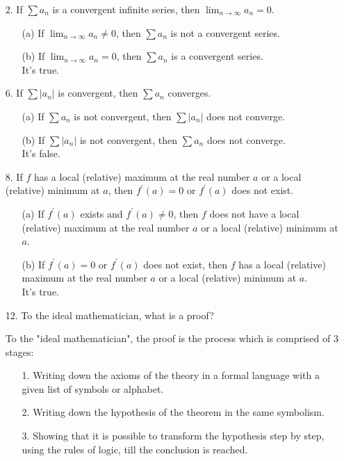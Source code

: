 \documentclass[12pt, a4paper]{article}                  %
\begin{document}
\begin{enumerate}
\item[2.]
If $\sum a_n$ is a convergent infinite series, then $\lim_{n \to \infty} a_n = 0$.
\begin{enumerate}
\item[(a)]
If $\lim_{n \to \infty} a_n \neq 0$, then $\sum a_n$ is not a convergent series.
\item[(b)]
If $\lim_{n \to \infty} a_n = 0$, then $\sum a_n$ is a convergent series.\\
It's true.
\end{enumerate}

\item[6.]
If $\sum |a_n|$ is convergent, then $\sum a_n$ converges.
\begin{enumerate}
\item[(a)]
If $\sum a_n$ is not convergent, then $\sum |a_n|$ does not converge.
\item[(b)]
If $\sum |a_n|$ is not convergent, then $\sum a_n$ does not converge.\\
It's false.
\end{enumerate}

\item[8.]
If $f$ has a local (relative) maximum at the real number $a$ or a
local (relative) minimum at $a$, then $f^{'}(a) = 0$ or $f^{'}(a)$ does not exist.
\begin{enumerate}
\item[(a)]
If $f^{'}(a)$ exists and $f^{'}(a) \neq 0$, then $f$ does not have a local
(relative) maximum at the real number $a$ or a local (relative) minimum at $a$.
\item[(b)]
If $f^{'}(a) = 0$ or $f^{'}(a)$ does not exist, then $f$ has a local
(relative) maximum at the real number $a$ or a local (relative) minimum at $a$.\\
It's true.
\end{enumerate}

\item[12.]
To the ideal mathematician, what is a proof?

To the "ideal mathematician", the proof is the process which is comprised of 3 stages:
\begin{enumerate}
\item[1.]
Writing down the axioms of the theory in a formal language with a given list of symbols or alphabet.
\item[2.]
Writing down the hypothesis of the theorem in the same symbolism.
\item[3.]
Showing that it is possible to transform the hypothesis step by step, using the rules of logic, till the conclusion is reached.
\end{enumerate}


\end{enumerate}
\end{document}
